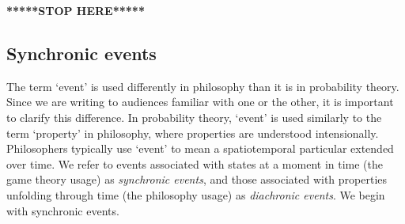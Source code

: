 \documentclass[
11pt,
titlepage,
reqno,
]{article}%
\theoremstyle{definition}
\begin{document}
%
	
	\textbf{*****STOP HERE*****}
	
	
	\subsection{Synchronic events}
	
	The term `event' is used differently in philosophy than it is in probability theory. 
	Since we are writing to audiences familiar with one or the other, it is important to clarify this difference. 
	In probability theory, `event' is used similarly to the term `property' in philosophy, where properties are understood intensionally. 
	Philosophers typically use `event' to mean a spatiotemporal particular extended over time. 
	We refer to events associated with states at a moment in time (the game theory usage) as \textit{synchronic events}, and those associated with properties unfolding through time (the philosophy usage) as \textit{diachronic events}.
	We begin with synchronic events.
	
\end{document}
